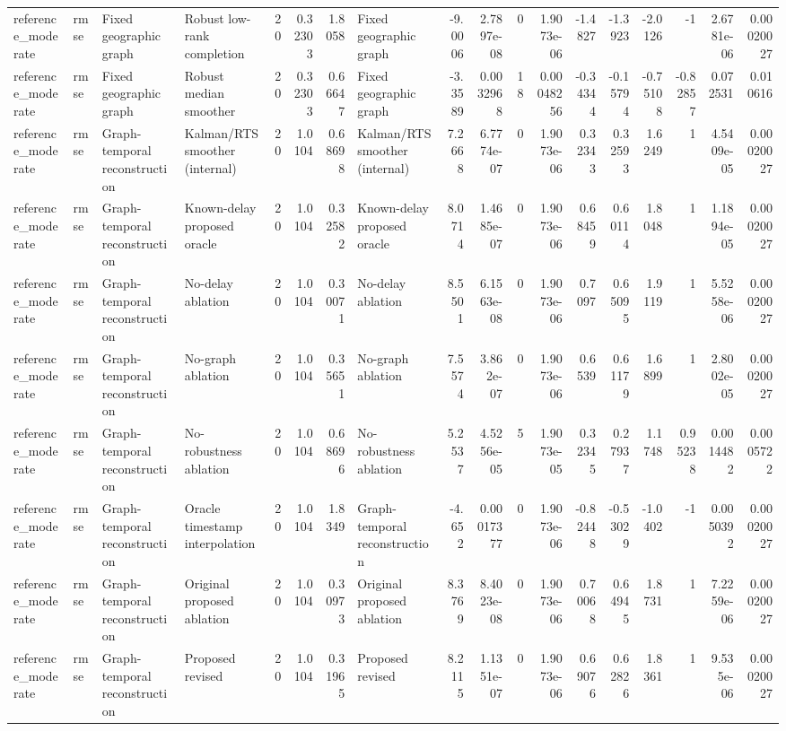\begin{table}[!htbp]
{\begin{tabular}{llllrrrlrrrrrrrrrr}
reference_moderate & rmse & Fixed geographic graph & Robust low-rank completion & 20 & 0.32303 & 1.8058 & Fixed geographic graph & -9.0006 & 2.7897e-08 & 0 & 1.9073e-06 & -1.4827 & -1.3923 & -2.0126 & -1 & 2.6781e-06 & 0.00020027 \\
reference_moderate & rmse & Fixed geographic graph & Robust median smoother & 20 & 0.32303 & 0.66647 & Fixed geographic graph & -3.3589 & 0.0032968 & 18 & 0.00048256 & -0.34344 & -0.15794 & -0.75108 & -0.82857 & 0.072531 & 0.010616 \\
reference_moderate & rmse & Graph-temporal reconstruction & Kalman/RTS smoother (internal) & 20 & 1.0104 & 0.68698 & Kalman/RTS smoother (internal) & 7.2668 & 6.7774e-07 & 0 & 1.9073e-06 & 0.32343 & 0.32593 & 1.6249 & 1 & 4.5409e-05 & 0.00020027 \\
reference_moderate & rmse & Graph-temporal reconstruction & Known-delay proposed oracle & 20 & 1.0104 & 0.32582 & Known-delay proposed oracle & 8.0714 & 1.4685e-07 & 0 & 1.9073e-06 & 0.68459 & 0.60114 & 1.8048 & 1 & 1.1894e-05 & 0.00020027 \\
reference_moderate & rmse & Graph-temporal reconstruction & No-delay ablation & 20 & 1.0104 & 0.30071 & No-delay ablation & 8.5501 & 6.1563e-08 & 0 & 1.9073e-06 & 0.7097 & 0.65095 & 1.9119 & 1 & 5.5258e-06 & 0.00020027 \\
reference_moderate & rmse & Graph-temporal reconstruction & No-graph ablation & 20 & 1.0104 & 0.35651 & No-graph ablation & 7.5574 & 3.862e-07 & 0 & 1.9073e-06 & 0.6539 & 0.61179 & 1.6899 & 1 & 2.8002e-05 & 0.00020027 \\
reference_moderate & rmse & Graph-temporal reconstruction & No-robustness ablation & 20 & 1.0104 & 0.68696 & No-robustness ablation & 5.2537 & 4.5256e-05 & 5 & 1.9073e-05 & 0.32345 & 0.27937 & 1.1748 & 0.95238 & 0.0014482 & 0.0005722 \\
reference_moderate & rmse & Graph-temporal reconstruction & Oracle timestamp interpolation & 20 & 1.0104 & 1.8349 & Graph-temporal reconstruction & -4.652 & 0.00017377 & 0 & 1.9073e-06 & -0.82448 & -0.53029 & -1.0402 & -1 & 0.0050392 & 0.00020027 \\
reference_moderate & rmse & Graph-temporal reconstruction & Original proposed ablation & 20 & 1.0104 & 0.30973 & Original proposed ablation & 8.3769 & 8.4023e-08 & 0 & 1.9073e-06 & 0.70068 & 0.64945 & 1.8731 & 1 & 7.2259e-06 & 0.00020027 \\
reference_moderate & rmse & Graph-temporal reconstruction & Proposed revised & 20 & 1.0104 & 0.31965 & Proposed revised & 8.2115 & 1.1351e-07 & 0 & 1.9073e-06 & 0.69076 & 0.62826 & 1.8361 & 1 & 9.535e-06 & 0.00020027 \\

\end{tabular}}
\end{table}
